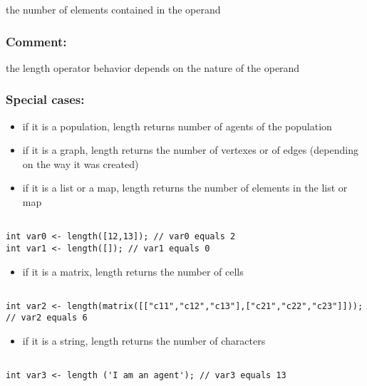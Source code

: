 \documentclass[]{book}
\providecommand{\tightlist}{%
  \setlength{\itemsep}{0pt}\setlength{\parskip}{0pt}}
\theoremstyle{definition}
\theoremstyle{definition}
\theoremstyle{definition}
\theoremstyle{remark}
\begin{document}
the number of elements contained in the operand

\subsubsection{Comment:}\label{comment-59}

the length operator behavior depends on the nature of the operand

\subsubsection{Special cases:}\label{special-cases-87}

\begin{itemize}
\tightlist
\item
  if it is a population, length returns number of agents of the
  population\\
\item
  if it is a graph, length returns the number of vertexes or of edges
  (depending on the way it was created)\\
\item
  if it is a list or a map, length returns the number of elements in the
  list or map
\end{itemize}

\begin{verbatim}
 
int var0 <- length([12,13]); // var0 equals 2 
int var1 <- length([]); // var1 equals 0
\end{verbatim}

\begin{itemize}
\tightlist
\item
  if it is a matrix, length returns the number of cells
\end{itemize}

\begin{verbatim}
 
int var2 <- length(matrix([["c11","c12","c13"],["c21","c22","c23"]])); // var2 equals 6
\end{verbatim}

\begin{itemize}
\tightlist
\item
  if it is a string, length returns the number of characters
\end{itemize}

\begin{verbatim}
 
int var3 <- length ('I am an agent'); // var3 equals 13
\end{verbatim}
\end{document}
